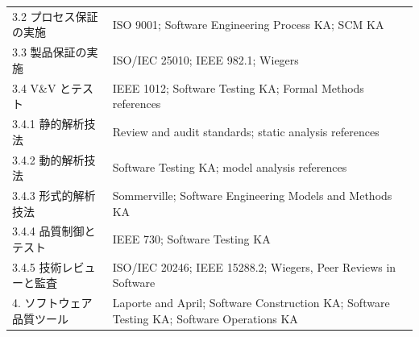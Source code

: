 {\begin{longtable}{L{0.45\textwidth}L{0.48\textwidth}}
3.2 プロセス保証の実施 & ISO 9001; Software Engineering Process KA; SCM KA \\
3.3 製品保証の実施 & ISO/IEC 25010; IEEE 982.1; Wiegers \\
3.4 V\&V とテスト & IEEE 1012; Software Testing KA; Formal Methods references \\
3.4.1 静的解析技法 & Review and audit standards; static analysis references \\
3.4.2 動的解析技法 & Software Testing KA; model analysis references \\
3.4.3 形式的解析技法 & Sommerville; Software Engineering Models and Methods KA \\
3.4.4 品質制御とテスト & IEEE 730; Software Testing KA \\
3.4.5 技術レビューと監査 & ISO/IEC 20246; IEEE 15288.2; Wiegers, Peer Reviews in Software \\
4. ソフトウェア品質ツール & Laporte and April; Software Construction KA; Software Testing KA; Software Operations KA \\
\bottomrule
\end{longtable}}
